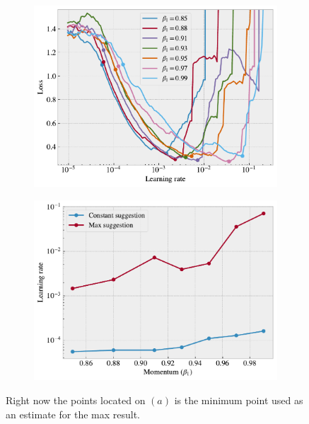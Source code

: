 \begin{figure}[H]
  \centering
  \begin{subfigure}[t]{0.49\textwidth}
      \centering
      \includegraphics[width=\textwidth]{figures/ML/LR_momentum_test_a.pdf}
      \caption{}
  \end{subfigure}
  \hfill
  \begin{subfigure}[t]{0.49\textwidth}
      \centering
      \includegraphics[width=\textwidth]{figures/ML/LR_momentum_test_b.pdf}
      \caption{}
  \end{subfigure}
  \hfill
  \caption{Right now the points located on $(a)$ is the minimum point used as an estimate for the max result. }
  \label{fig:LR_range_mom}
\end{figure}

